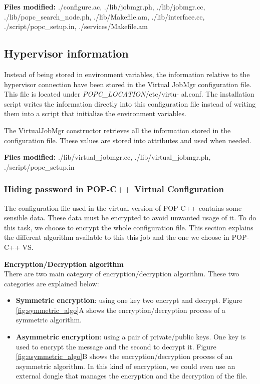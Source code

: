 \textbf{Files modified:} ./configure.ac, ./lib/jobmgr.ph, ./lib/jobmgr.cc, ./lib/popc\_search\_node.ph, ./lib/Makefile.am, ./lib/interface.cc, ./script/popc\_setup.in, ./services/Makefile.am\s



%
%
\pagebreak
\subsection{Hypervisor information}
Instead of being stored in environment variables, the information relative to the hypervisor connection have been stored in the Virtual JobMgr configuration file. This file is located under \textit{POPC\_LOCATION}/etc/virtu- al.conf. The installation script writes the information directly into this configuration file instead of writing them into a script that initialize the environment variables. \s

The VirtualJobMgr constructor retrieves all the information stored in the configuration file. These values are stored into attributes and used when needed.\s

\textbf{Files modified: } ./lib/virtual\_jobmgr.cc, ./lib/virtual\_jobmgr.ph, ./script/popc\_setup.in\s

\subsubsection{Hiding password in POP-C++ Virtual Configuration}
The configuration file used in the virtual version of POP-C++ contains some sensible data. These data must be encrypted to avoid unwanted usage of it. To do this task, we choose to encrypt the whole configuration file. This section explains the different algorithm available to this this job and the one we choose in POP-C++ VS.\s


\textbf{Encryption/Decryption algorithm}\\
There are two main category of encryption/decryption algorithm. These two categories are explained below:

\begin{itemize}
\item \textbf{Symmetric encryption}: using one key two encrypt and decrypt. Figure \ref{fig:symmetric_algo}A shows the encryption/decryption process of a symmetric algorithm.
\item \textbf{Asymmetric encryption}: using a pair of private/public keys. One key is used to encrypt the message and the second to decrypt it. Figure \ref{fig:asymmetric_algo}B shows the encryption/decryption process of an asymmetric algorithm. In this kind of encryption, we could even use an external dongle that manages the encryption and the decryption of the file. 
\end{itemize}
 
